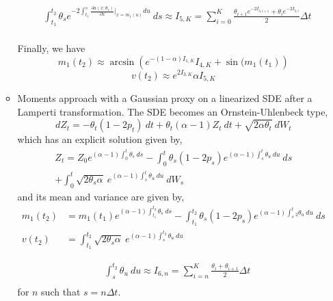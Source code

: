 \documentclass[a4paper, 12pt]{article}
\begin{document}
\begin{itemize}
\begin{itemize}
		\begin{equation*}
			\begin{split}
			& \int_{t_1}^{t_2} \theta_s e^{-2\int_{t_1}^{s} \frac{\partial a(x;\theta_s)}{\partial x}|_{x=m_1(u)} du } \ ds \approx I_{5,K}= \sum_{i=0}^K \frac{ \theta_{i+1}e^{-2 I_{3,i+1} } + \theta_{i}e^{-2 I_{3,i} } }{2} \Delta t \\
			\end{split}
		\end{equation*}

Finally, we have
		\begin{equation}
			m_{1}(t_2)  \approx \arcsin \left(   e^{-(1-\alpha)I_{1,K}} I_{4,K} +  \sin(m_{1}(t_1) \right)
	\end{equation}
	\begin{equation}
		v(t_2)  \approx e^{2I_{3,K}} \alpha I_{5,K}
\end{equation}

		\item Moments approach with a Gaussian proxy on a linearized SDE after a Lamperti transformation. The SDE becomes an Ornstein-Uhlenbeck  type,
		\begin{equation}
			dZ_t = - \theta_t (1-2p_t) \ dt + \theta_t(\alpha -1)  Z_t \ dt + \sqrt{2 \alpha \theta_t} \ dW_t
		\end{equation}
		which has an explicit solution given by,
		\begin{eqnarray*}
			Z_t = Z_0 e^{(\alpha-1)\int_0^t \theta_s \ ds } - \int_0^t \theta_s (1-2p_s) e^{(\alpha-1)\int_s^t \theta_u \ du } \ ds \\ + \int_0^t \sqrt{2 \theta_s \alpha} \ e^{(\alpha-1)\int_s^t \theta_u \ du } \ dW_s
	\end{eqnarray*}
	and its mean and variance are given by,
	\begin{align}
		m_1(t_2) &= m_1(t_1) e^{(\alpha-1)\int_{t_1}^{t_2} \theta_s \ ds } - \int_{t_1}^{t_2} \theta_s (1-2p_s) e^{(\alpha-1)\int_s^t_2 \theta_u \ du } \ ds\\
		v(t_2) &= \int_{t_1}^{t_2} \sqrt{2 \theta_s \alpha} \ e^{(\alpha-1)\int_s^{t_2} \theta_u \ du }
\end{align}

\begin{equation*}
	\begin{split}
	& \int_s^{t_2} \theta_u \ du \approx I_{6,n}= \sum_{i=n}^K \frac{ \theta_i + \theta_{i+1} }{2}\Delta t \\
	\end{split}
\end{equation*}
for $n$ such that $s=n \Delta t$.


\end{itemize}
\end{itemize}
\end{document}
